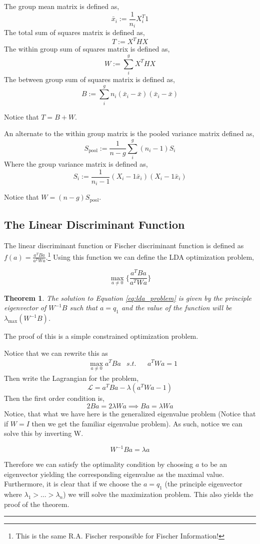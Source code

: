 \documentclass[twoside]{article}
\newtheorem{theorem}{Theorem}[section]
\newenvironment{proof}{{\bf Proof:}}{\hfill\rule{2mm}{2mm}}
\begin{document}
The group mean matrix is defined as, $$\bar{x}_i := \frac{1}{n_i}X_i^T1$$
The total sum of squares matrix is defined as, $$T := X^THX$$
The within group sum of squares matrix is defined as, $$W:=\sum_i^g X^THX$$
The between group sum of squares matrix is defined as,$$B:=\sum_i^g n_i(\bar{x}_i-\bar{x})(\bar{x}_i-\bar{x})$$

Notice that $T = B + W$.

An alternate to the within group matrix is the pooled variance matrix defined as,
$$S_{\text{pool}} := \frac{1}{n-g}\sum_i^g(n_i-1)S_i$$
Where the group variance matrix is defined as,
$$S_i := \frac{1}{n_i-1}(X_i - 1\bar{x}_i)(X_i - 1\bar{x}_i)$$

Notice that $W = (n-g)S_{\text{pool}}$.

\subsection{The Linear Discriminant Function}

The linear discriminant function or Fischer discriminant function is defined as $f(a) = \frac{a^TBa}{a^TWa}$.\footnote{This is the same R.A. Fischer responsible for Fischer Information!} Using this function we can define the LDA optimization problem,

\begin{equation}\max_{a\neq0}\{\frac{a^TBa}{a^TWa}\}\label{eq:lda_problem}\end{equation}

\begin{theorem} The solution to Equation \ref{eq:lda_problem} is given by the principle eigenvector of $W^{-1}B$ such that $a = q_1$ and the value of the function will be $\lambda_{\max}(W^{-1}B)$.
\end{theorem}

\begin{proof} The proof of this is a simple constrained optimization problem.

Notice that we can rewrite this as $$\begin{aligned}& \max_{a\neq0} a^TBa & s.t. && a^TWa = 1\end{aligned}$$
Then write the Lagrangian for the problem,
$$\mathcal{L} = a^TBa - \lambda(a^TWa - 1)$$
Then the first order condition is,
$$2Ba = 2\lambda Wa \implies Ba = \lambda Wa$$
Notice, that what we have here is the generalized eigenvalue problem (Notice that if $W = I$ then we get the familiar eigenvalue problem). As such, notice we can solve this by inverting W.

$$W^{-1}Ba = \lambda a$$

Therefore we can satisfy the optimality condition by choosing $a$ to be an eigenvector yielding the corresponding eigenvalue as the maximal value. Furthermore, it is clear that if we choose the $a = q_1$ (the principle eigenvector where $\lambda_1>\dots>\lambda_n$) we will solve the maximization problem. This also yields the proof of the theorem. 

\end{proof}
\end{document}
